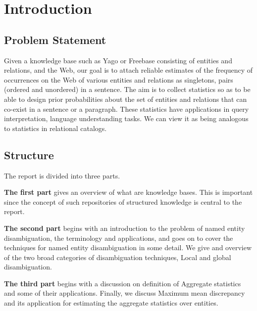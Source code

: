 \chapter{Introduction}
\section{Problem Statement}
Given a knowledge base such as Yago or Freebase consisting of entities and relations, and the Web, our goal is 
to attach reliable estimates of the frequency of occurrences on the Web of various entities and relations as 
singletons, pairs (ordered and unordered) in a sentence.  
The aim is to collect statistics so as to be able to design prior probabilities about the set of 
entities and relations that can co-exist in a sentence or a paragraph. These statistics have applications in 
query interpretation, language understanding tasks.  
We can view it as being analogous to statistics in relational catalogs.

\section{Structure}
The report is divided into three parts.

\textbf{The first part} gives an overview of what are knowledge bases. This is important 
since the concept of such repositories of structured knowledge is central to the
report. 

\textbf{The second part} begins with an introduction to the problem of named entity disambiguation, the 
terminology and applications, and goes on to cover the techniques for named entity disambiguation
in some detail. We give and overview of the two broad categories of disambiguation techniques, Local and
global disambiguation.

\textbf{The third part} begins with a discussion on definition of Aggregate statistics and 
some of their applications. Finally, we discuss Maximum mean discrepancy and its 
application for estimating the aggregate statistics over entities.